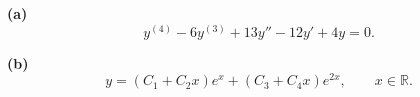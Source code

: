 \noindent\textbf{(a)} \[y^{(4)}-6y^{(3)}+13y''-12y'+4y=0.\]

\noindent\textbf{(b)} \[y=(C_1+C_2x)e^x+(C_3+C_4x)e^{2x},\qquad x\in\mathbb R.\]
